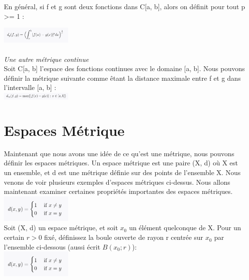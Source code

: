 En général, si f et g sont deux fonctions dans C[a, b], alors on définit pour tout p >= 1 :

\includegraphics[width=100pt]{./img/notions_math/metric/eq_fcn_con_1_2}
\\
\\
\textit{Une autre métrique continue}
\\
Soit C[a, b] l'espace des fonctions continues avec le domaine [a, b]. Nous pouvons définir la métrique suivante comme êtant la distance maximale entre f et g dans l'intervalle [a, b] : 
\\
\includegraphics[width=100pt]{./img/notions_math/metric/eq_fcn_con_2}


    
\section*{Espaces Métrique}
Maintenant que nous avons une idée de ce qu'est une métrique, nous pouvons définir les espaces métriques. Un espace métrique est une paire (X, d) où X est un ensemble, et d est une métrique définie sur des points de l'ensemble X. Nous venons de voir plusieurs exemples d'espaces métriques ci-dessus. Nous allons maintenant examiner certaines propriétés importantes des espaces métriques.
\\
\includegraphics[width=100pt]{./img/notions_math/metric/metric_discret.png}
\\
Soit (X, d) un espace métrique, et soit $x_0$ un élément quelconque de X. Pour un certain $r > 0$ fixé, définissez la boule ouverte de rayon r centrée sur $x_0$ par l'ensemble ci-dessous (aussi écrit $B(x_0 ; r)$): 
\\
\includegraphics[width=100pt]{./img/notions_math/metric/metric_discret.png}



